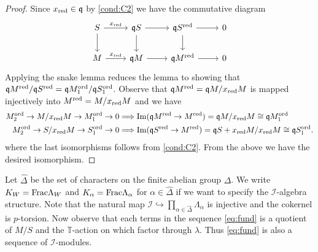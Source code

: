 \documentclass[leqno]{amsart}
\theoremstyle{definition}
\theoremstyle{remark}
\DeclareMathOperator{\Image}{Im}
\newcommand{\fq}{\mathfrak{q}}
\newcommand{\red}{\textnormal{red}}
\newcommand{\xx}{x_\textnormal{red}}
\newcommand{\TT}{\mathbb{T}} %
\newcommand{\I}{\mathcal{I}} %
\newcommand{\ord}{\textnormal{ord}} %
\begin{document}
\begin{proof}
Since $\xx\in \fq$ by \ref{cond:C2}
we have the commutative diagram
\[
\begin{tikzcd}
	S\arrow[r,"\xx"] \arrow[d]
	& \fq S \arrow[r] \arrow[d]
	& \fq S^{\red} \arrow[r] \arrow[d] & 0\\
	M\arrow[r,"\xx"]
	& \fq M \arrow[r]
	& \fq M^{\red} \arrow[r] & 0
\end{tikzcd}
\]
Applying the snake lemma
reduces the lemma to showing that
$\fq M^{\red}/\fq S^{\red}=\fq M_1^{\ord}/\fq S_1^{\ord}$.
Observe that $\fq M^{\red}=\fq M/\xx M$ 
is mapped injectively into $M^{\red}=M/\xx M$ and we have
\begin{align*}
    M_2^{\ord}\to M/\xx M\to M_1^{\ord}\to 0
    &\Longrightarrow
	\Image(\fq M^{\red}\to M^{\red})=
    \fq M/\xx M\cong\fq M_1^{\ord}\\
    M_2^{\ord}\to S/\xx M\to S_1^{\ord}\to 0
    &\Longrightarrow
	\Image(\fq S^{\red}\to M^{\red})=
    \fq S+\xx M/\xx M\cong\fq S_1^{\ord}.
\end{align*}
where the last isomorphisms 
follows from \ref{cond:C2}.
From the above we have the desired isomorphism.
\end{proof}


Let $\hat{\Delta}$ be the set 
of characters on the finite abelian group $\Delta$.
We write $K_W=\textnormal{Frac}\Lambda_W$
and $K_\alpha=\textnormal{Frac}\Lambda_\alpha$
for $\alpha\in \hat{\Delta}$
if we want to specify the $\I$-algebra structure.
Note that the natural map
$\I\hookrightarrow\prod_{\alpha\in\hat{\Delta}}\Lambda_\alpha$ 
is injective and the cokernel is $p$-torsion.
Now observe that each terms in 
the sequence \eqref{eq:fund}
is a quotient of $M/S$ 
and the $\TT$-action on which factor through $\lambda$.
Thus \eqref{eq:fund} is also a sequence of $\I$-modules.
\end{document}
